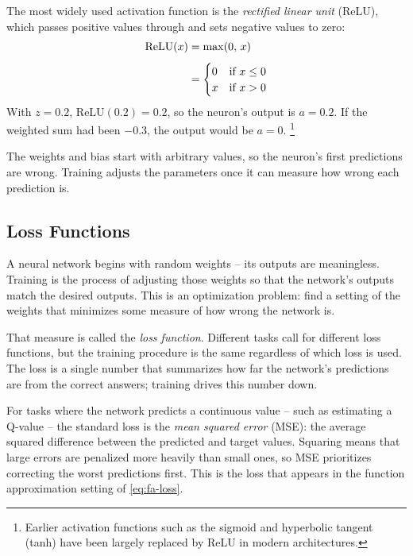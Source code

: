 \smallskip
The most widely used activation function is the \emph{rectified
linear unit} (ReLU), which passes positive values through and sets
negative values to zero:
%
\begin{align}
\label{eq:relu}
\text{ReLU}(x) &= \max(0,\, x) \\[4pt]
\notag
               &= \begin{cases}
                  0 & \text{if } x \leq 0 \\
                  x & \text{if } x > 0
                  \end{cases}
\end{align}
%
With $z = 0.2$, $\text{ReLU}(0.2) = 0.2$, so the neuron's output is
$a = 0.2$. If the weighted sum had been $-0.3$, the output would be
$a = 0$.%
\footnote{Earlier activation functions such as the sigmoid and
hyperbolic tangent (tanh) have been largely replaced by ReLU in
modern architectures.}

\smallskip
The weights and bias start with arbitrary values, so the neuron's first
predictions are wrong. Training adjusts the parameters once it can
measure how wrong each prediction is.



\subsection{Loss Functions}
\label{subsec:loss-functions}

A neural network begins with random weights -- its outputs are
meaningless. Training is the process of adjusting those weights so
that the network's outputs match the desired outputs. This is an
optimization problem: find a setting of the weights that minimizes
some measure of how wrong the network is.

\smallskip
That measure is called the \emph{loss function}. Different tasks
call for different loss functions, but the training procedure is
the same regardless of which loss is used. The loss is a single
number that summarizes how far the network's predictions are from
the correct answers; training drives this number down.

\smallskip
For tasks where the network predicts a continuous value -- such as
estimating a Q-value -- the standard loss is the \emph{mean squared
error} (MSE): the average squared difference between the predicted
and target values. Squaring means that large errors are penalized
more heavily than small ones, so MSE prioritizes correcting the
worst predictions first. This is the loss that appears in the
function approximation setting of \cref{eq:fa-loss}.


